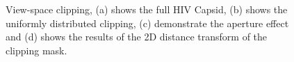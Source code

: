 \begin{figure}[t]
\centering
{}
\caption{\label{fig:df}View-space clipping, (a) shows the full HIV Capsid, (b) shows the uniformly distributed clipping, (c) demonstrate the aperture effect and (d) shows the results of the 2D distance transform of the clipping mask.}
\vspace{-8mm}
\end{figure}

